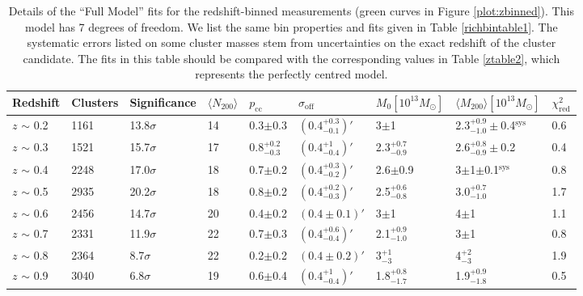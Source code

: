 \begin{landscape}
\begin{table}
\centering
    \caption[Shear Results for Redshift-Binned Clusters (Full Model)]{Details of the ``Full Model'' fits for the redshift-binned measurements (green curves in Figure \ref{plot:zbinned}). This model has 7 degrees of freedom. We list the same bin properties and fits given in Table \ref{richbintable1}. The systematic errors listed on some cluster masses stem from uncertainties on the exact redshift of the cluster candidate. The fits in this table should be compared with the corresponding values in Table \ref{ztable2}, which represents the perfectly centred model.}
    \begin{tabular}{lllllllll}
      \hline
      Redshift & Clusters & Significance & $\langle N_{200} \rangle$ & $p_{\mathrm{cc}}$ & $\sigma_{\mathrm{off}}$ & $M_0 \left[ 10^{13} M_{\odot}\right]$ & $\langle M_{200} \rangle \left[ 10^{13} M_{\odot}\right]$ & $\chi^2_{\mathrm{red}}$ \\ \hline
      $z$ $\sim$ 0.2 & 1161 & 13.8$\sigma$ & 14 & 0.3$\pm$0.3 & $(0.4^{+0.3}_{-0.1})'$ & 3$\pm$1 & 2.3$^{+0.9}_{-1.0}\pm$0.4$^{\mathrm{sys}}$ & 0.6 \\
      $z$ $\sim$ 0.3 & 1521 & 15.7$\sigma$ & 17 & 0.8$^{+0.2}_{-0.3}$ & $(0.4^{+1}_{-0.4})'$ & 2.3$^{+0.7}_{-0.9}$ & 2.6$^{+0.8}_{-0.9}\pm$0.2 & 0.4 \\
      $z$ $\sim$ 0.4 & 2248 & 17.0$\sigma$ & 18 & 0.7$\pm$0.2 & $(0.4^{+0.3}_{-0.2})'$ & 2.6$\pm$0.9 & 3$\pm$1$\pm$0.1$^{\mathrm{sys}}$ & 0.8 \\
      $z$ $\sim$ 0.5 & 2935 & 20.2$\sigma$ & 18 & 0.8$\pm$0.2 & $(0.4^{+0.2}_{-0.3})'$ & 2.5$^{+0.6}_{-0.8}$ & 3.0$^{+0.7}_{-1.0}$ & 1.7 \\
      $z$ $\sim$ 0.6 & 2456 & 14.7$\sigma$ & 20 & 0.4$\pm$0.2 & $(0.4\pm0.1)'$ & 3$\pm$1 & 4$\pm$1 & 1.1 \\
      $z$ $\sim$ 0.7 & 2331 & 11.9$\sigma$ & 22 & 0.7$\pm$0.3 & $(0.4^{+0.6}_{-0.4})'$ & 2.1$^{+0.9}_{-1.0}$ & 3$\pm$1 & 0.8 \\
      $z$ $\sim$ 0.8 & 2364 & 8.7$\sigma$ & 22 & 0.2$\pm$0.2 & $(0.4\pm0.2)'$ & 3$^{+1}_{-3}$ & 4$^{+2}_{-3}$ & 1.9 \\ 
      $z$ $\sim$ 0.9 & 3040 & 6.8$\sigma$ & 19 & 0.6$\pm$0.4 & $(0.4^{+1}_{-0.4})'$ & 1.8$^{+0.8}_{-1.7}$ & 1.9$^{+0.9}_{-1.8}$ & 0.5 \\
      \hline
    \end{tabular}
    \label{ztable1}
\end{table}


\end{landscape}
